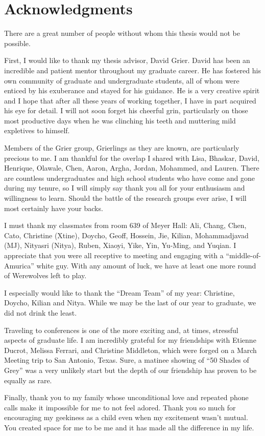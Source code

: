\chapter*{Acknowledgments}
\label{ch:acknowledgments}

There are a great number of people without whom this thesis
would not be possible.

First, I would like to thank my thesis advisor, David Grier. David has been
an incredible and patient mentor throughout my graduate career.
He has fostered his own community of graduate and undergraduate
students, all of whom were enticed by his exuberance and stayed for
his guidance. He is a very creative spirit and I hope that after
all these years of working together, I have in part acquired his eye for detail.
I will not soon forget his cheerful grin, particularly on those
most productive days when he was clinching his teeth and muttering
mild expletives to himself.

Members of the Grier group, Grierlings as they are known, are
particularly precious to me. I am thankful for the overlap I shared
with Lisa, Bhaskar, David, Henrique, Olawale, Chen, Aaron,
Argha, Jordan, Mohammed, and Lauren. There are countless
undergraduates and high school students who have come
and gone during my tenure, so I will simply say thank you all for
your enthusiasm and willingness to learn. Should the battle of the
research groups ever arise, I will most certainly have your backs.

I must thank my classmates from room 639 of Meyer Hall:
Ali, Chang, Chen, Cato, Christine (Xtine), Doycho, Geoff, Hossein,
Jie, Kilian, Mohammadjavad (MJ), Nityasri (Nitya), Ruben, Xiaoyi,
Yike, Yin, Yu-Ming, and Yuqian. I appreciate that you were all
receptive to meeting and engaging with a ``middle-of-Amurica''
white guy. With any amount of luck, we have at least one
more round of Werewolves left to play.

I especially would like to thank the ``Dream Team'' of my year:
Christine, Doycho, Kilian and Nitya. While we may be the last of our
year to graduate, we did not drink the least.

Traveling to conferences is one of the more exciting and, at
times, stressful aspects of graduate life. I am incredibly grateful
for my friendships with Etienne Ducrot, Melissa Ferrari, and Christine
Middleton, which were forged on a March Meeting trip
to San Antonio, Texas. Sure, a matinee showing of ``50 Shades of Grey''
was a very unlikely start but the depth of our friendship has proven to
be equally as rare.

Finally, thank you to my family whose unconditional love and repeated
phone calls make it impossible for me to not feel adored. Thank you so
much for encouraging my geekiness as a child even when my excitement
wasn't mutual. You created space for me to be me and it has made all
the difference in my life.
